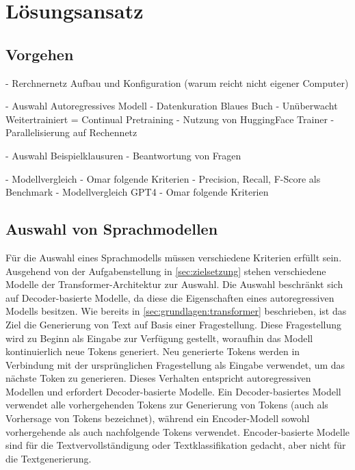 \chapter{Lösungsansatz}\label{ch:approach}
\section*{Vorgehen}
- Rerchnernetz Aufbau und Konfiguration (warum reicht nicht eigener Computer)

- Auswahl Autoregressives Modell
- Datenkuration Blaues Buch
- Unüberwacht Weitertrainiert = Continual Pretraining
    - Nutzung von HuggingFace Trainer
    - Parallelisierung auf Rechennetz

- Auswahl Beispielklausuren
- Beantwortung von Fragen

- Modellvergleich
    - Omar folgende Kriterien
    - Precision, Recall, F-Score als Benchmark
- Modellvergleich GPT4
    - Omar folgende Kriterien

\section{Auswahl von Sprachmodellen}

Für die Auswahl eines Sprachmodells müssen verschiedene Kriterien erfüllt sein.
Ausgehend von der Aufgabenstellung in \ref{sec:zielsetzung} stehen verschiedene Modelle der Transformer-Architektur zur Auswahl.
Die Auswahl beschränkt sich auf Decoder-basierte Modelle, da diese die Eigenschaften eines autoregressiven Modells besitzen.
Wie bereits in \ref{sec:grundlagen:transformer} beschrieben, ist das Ziel die Generierung von Text auf Basis einer Fragestellung. %
Diese Fragestellung wird zu Beginn als Eingabe zur Verfügung gestellt, woraufhin das Modell kontinuierlich neue Tokens generiert.
Neu generierte Tokens werden in Verbindung mit der ursprünglichen Fragestellung als Eingabe verwendet, um das nächste Token zu generieren.
Dieses Verhalten entspricht autoregressiven Modellen und erfordert Decoder-basierte Modelle.
Ein Decoder-basiertes Modell verwendet alle vorhergehenden Tokens zur Generierung von Tokens (auch als Vorhersage von Tokens bezeichnet), während ein Encoder-Modell sowohl vorhergehende als auch nachfolgende Tokens verwendet.
Encoder-basierte Modelle sind für die Textvervollständigung oder Textklassifikation gedacht, aber nicht für die Textgenerierung.\\

